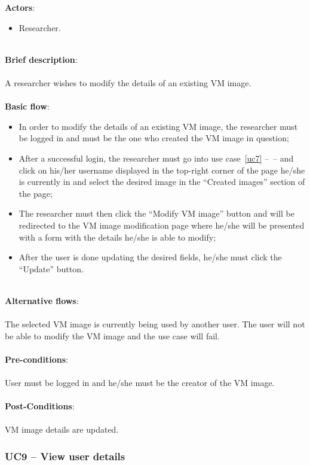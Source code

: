 \textbf{Actors}:

\begin{itemize}
\item Researcher.
\end{itemize}

\ \\
\textbf{Brief description}:\\
\ \\
A researcher wishes to modify the details of an existing VM image.\\
\ \\
\textbf{Basic flow}:

\begin{itemize}
\item In order to modify the details of an existing VM image, the researcher must be logged in and must be the one who created the VM image in question;
\item After a successful login, the researcher must go into use case~\ref{uc7} --~-- and click on his/her username displayed in the top-right corner of the page he/she is currently in and select the desired image in the ``Created images'' section of the page;
\item The researcher must then click the ``Modify VM image'' button and will be redirected to the VM image modification page where he/she will be presented with a form with the details he/she is able to modify;
\item After the user is done updating the desired fields, he/she must click the ``Update'' button.
\end{itemize}

\ \\
\textbf{Alternative flows}:\\
\ \\
The selected VM image is currently being used by another user. The user will not be able to modify the VM image and the use case will fail.\\
\ \\
\textbf{Pre-conditions}:\\
\ \\
User must be logged in and he/she must be the creator of the VM image.\\
\ \\
\textbf{Post-Conditions}:\\
\ \\
VM image details are updated.


\subsubsection{UC9 -- View user details}\label{uc9}

